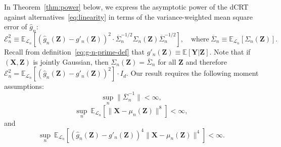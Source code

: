 \documentclass[12pt]{article}
\theoremstyle{definition}
\theoremstyle{remark}
\newcommand{\prx}{\bm X}
\newcommand{\prz}{\bm Z}
\newcommand{\pry}{{\bm Y}}
\begin{document}
In Theorem~\ref{thm:power} below, we express the asymptotic power of the dCRT against alternatives~\eqref{eq:linearity} in terms of the variance-weighted mean square  error of $\widehat g_n$:
\begin{equation} 
	\mathcal E^2_n \equiv  \mathbb E_{\mathcal L_n}\left[(\widehat g_n(\prz)-g'_n(\prz))^2 \cdot \overline \Sigma_n^{-1/2}\Sigma_n(\prz)\overline \Sigma_n^{-1/2}\right], \quad \text{where} \ \overline \Sigma_n\equiv \mathbb E_{\mathcal L_n}[\Sigma_n(\prz)].
\end{equation}
Recall from definition~\eqref{eq:g-n-prime-def} that $g'_n(\prz) \equiv \mathbb E[\pry|\prz]$. Note that if $(\prx, \prz)$ is jointly Gaussian, then $\Sigma_n(\prz) = \overline \Sigma_n$ for all $\prz$ and therefore $\mathcal E_n^2 = \mathbb E_{\mathcal L_n}[(\widehat g_n(\prz)-g'_n(\prz))^2] \cdot I_d$. Our result requires the following moment assumptions:
	\begin{equation}
\sup_{n} \|\overline \Sigma_n^{-1}\| < \infty,
\label{eq:s-n-inverse-assump}
\end{equation}
\begin{equation}
	\sup_n\ \mathbb E_{\mathcal L_n}[\|\prx - \mu_n(\prz)\|^8] < \infty,
	\label{eq:eighth-moment-assump-1}
\end{equation}
and
\begin{equation}
	\sup_n\ \mathbb E_{\mathcal L_n}[(\widehat g_n(\prz)-g'_n(\prz))^4\|\prx - \mu_n(\prz)\|^4] < \infty.
	\label{eq:eighth-moment-assump-2}
\end{equation}
\end{document}
